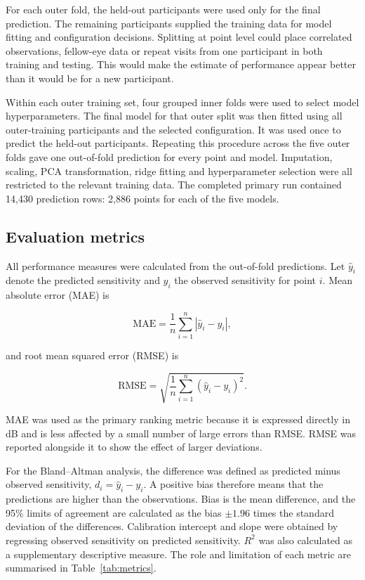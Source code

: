 For each outer fold, the held-out participants were used only for the final prediction. The remaining participants supplied the training data for model fitting and configuration decisions. Splitting at point level could place correlated observations, fellow-eye data or repeat visits from one participant in both training and testing. This would make the estimate of performance appear better than it would be for a new participant.

Within each outer training set, four grouped inner folds were used to select model hyperparameters. The final model for that outer split was then fitted using all outer-training participants and the selected configuration. It was used once to predict the held-out participants. Repeating this procedure across the five outer folds gave one out-of-fold prediction for every point and model. Imputation, scaling, PCA transformation, ridge fitting and hyperparameter selection were all restricted to the relevant training data. The completed primary run contained 14,430 prediction rows: 2,886 points for each of the five models.

\subsection{Evaluation metrics}

All performance measures were calculated from the out-of-fold predictions. Let $\hat{y}_i$ denote the predicted sensitivity and $y_i$ the observed sensitivity for point $i$. Mean absolute error (MAE) is

\begin{equation}
  \mathrm{MAE} = \frac{1}{n}\sum_{i=1}^{n}\left|\hat{y}_i - y_i\right|,
\end{equation}

and root mean squared error (RMSE) is

\begin{equation}
  \mathrm{RMSE} = \sqrt{\frac{1}{n}\sum_{i=1}^{n}\left(\hat{y}_i - y_i\right)^2}.
\end{equation}

MAE was used as the primary ranking metric because it is expressed directly in dB and is less affected by a small number of large errors than RMSE. RMSE was reported alongside it to show the effect of larger deviations.

For the Bland--Altman analysis, the difference was defined as predicted minus observed sensitivity, $d_i = \hat{y}_i - y_i$. A positive bias therefore means that the predictions are higher than the observations. Bias is the mean difference, and the 95\% limits of agreement are calculated as the bias $\pm 1.96$ times the standard deviation of the differences. Calibration intercept and slope were obtained by regressing observed sensitivity on predicted sensitivity. $R^2$ was also calculated as a supplementary descriptive measure. The role and limitation of each metric are summarised in Table~\ref{tab:metrics}.

